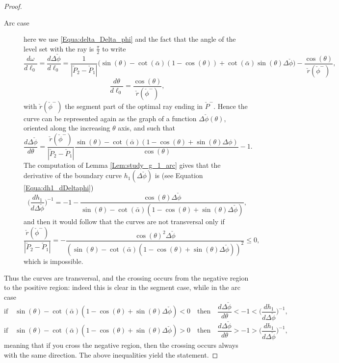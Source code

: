 \documentclass[reqno]{amsart}
\theoremstyle{definition} \newtheorem{definition}{Definition}[section]
\theoremstyle{definition} \newtheorem{remark}[definition]{Remark}
\theoremstyle{plain} \newtheorem{lemma}[definition]{Lemma}
\theoremstyle{plain} \newtheorem{proposition}[definition]{Proposition}
\theoremstyle{plain} \newtheorem{theorem}[definition]{Theorem}
\theoremstyle{plain} \newtheorem{corollary}[definition]{Corollary}
\theoremstyle{definition} \newtheorem{example}[definition]{Example}
\theoremstyle{plain} \newtheorem{claim}[clai]{Claim}
\theoremstyle{definition} \newtheorem{assumption}[definition]{Assumption}
\theoremstyle{definition} \newtheorem{observation}[definition]{Observation}
\newcommand{\1}{\mathbbm 1}
\numberwithin{equation}{section} %
\theoremstyle{plain} \newtheorem*{theorem*}{Theorem}
\theoremstyle{plain} \newtheorem{mthm}[maintheorem]{Main Theorem}
\theoremstyle{plain} \newtheorem*{mthm*}{Main Theorem}
\theoremstyle{plain} \newtheorem*{conjecture*}{Conjecture}
\theoremstyle{plain} \newtheorem{conjecture}[definition]{Conjecture}
\theoremstyle{plain} \newtheorem*{problem*}{Problem}
\begin{document}
\begin{proof}
\begin{description}
\item[Arc case] here we use \eqref{Equa:delta_Delta_phi} and the fact that the angle of the level set with the ray is $\frac{\pi}{2}$ to write
\begin{equation*}
\frac{d\omega}{d\ell_0} = \frac{d\Delta \check \phi}{d\ell_0} = \frac{1}{|\check P_2 - \check P_1|} \big( \sin(\theta) - \cot(\bar \alpha) (1 - \cos(\theta)) + \cot(\bar\alpha) \sin(\theta) \Delta \check \phi \big) - \frac{\cos(\theta)}{\check r(\check \phi^-)},
\end{equation*}
\begin{equation*}
\frac{d\theta}{d\ell_0} = \frac{\cos(\theta)}{\check r(\check \phi^-)},
\end{equation*}
with $\check r(\check \phi^-)$ the segment part of the optimal ray ending in $\check P^-$. Hence the curve can be represented again as the graph of a function $\Delta \check \phi(\theta)$, oriented along the increasing $\theta$ axis, and such that
\begin{equation*}
\frac{d\Delta \check \phi}{d\theta} = \frac{\check r(\check \phi^-)}{|\check P_2 - \check P_1|} \frac{\sin(\theta) - \cot(\bar \alpha) (1 - \cos(\theta) + \sin(\theta) \Delta \phi)}{\cos(\theta)} - 1.
\end{equation*}
The computation of Lemma \ref{Lem:study_g_1_arc} gives that the derivative of the boundary curve $h_1(\Delta \check \phi)$ is (see Equation \eqref{Equa:dh1_dDeltaphi})
\begin{equation*}
\bigg( \frac{dh_1}{d\Delta \check \phi} \bigg)^{-1} = - 1 - \frac{\cos(\theta) \Delta \check \phi}{\sin(\theta) - \cot(\bar \alpha) (1 - \cos(\theta) + \sin(\theta) \Delta \check \phi)},
\end{equation*}
and then it would follow that the curves are not transversal only if
\begin{equation*}
\frac{\check r(\check \phi^-)}{|\check P_2 - \check P_1|} = - \frac{\cos(\theta)^2 \Delta \check \phi}{(\sin(\theta) - \cot(\bar \alpha) (1 - \cos(\theta) + \sin(\theta) \Delta \check \phi))^2} \leq 0,
\end{equation*}
which is impossible.
\end{description}
Thus the curves are transversal, and the crossing occurs from the negative region to the positive region: indeed this is clear in the segment case, while in the arc case
$$
\text{if} \quad \sin(\theta) - \cot(\bar \alpha)(1 - \cos(\theta) + \sin(\theta) \Delta \check \phi) < 0 \quad \text{then} \quad \frac{d\Delta \check \phi}{d\theta} < - 1 < \bigg( \frac{dh_1}{d\Delta \check \phi} \bigg)^{-1},
$$
$$
\text{if} \quad \sin(\theta) - \cot(\bar \alpha)(1 - \cos(\theta) + \sin(\theta) \Delta \check \phi) > 0 \quad \text{then} \quad \frac{d\Delta \check \phi}{d\theta} > -1 > \bigg( \frac{dh_1}{d\Delta \check \phi} \bigg)^{-1},
$$
meaning that if you cross the negative region, then the crossing occurs always with the same direction.
The above inequalities yield the statement.
\end{proof}
\end{document}
